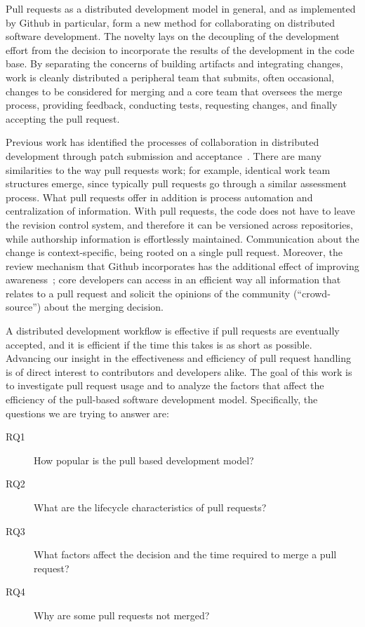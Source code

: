 \documentclass{sig-alternate}
\begin{document}
Pull requests as a distributed development model in general, and as implemented
by Github in particular, form a new method for collaborating on distributed
software development. The novelty lays on the decoupling of the development
effort from the decision to incorporate the results of the development in the
code base. By separating the concerns of building artifacts and integrating
changes, work is cleanly distributed a peripheral team that submits, often
occasional, changes to be considered for merging and a core team that oversees
the merge process, providing feedback, conducting tests, requesting changes, and
finally accepting the pull request.

Previous work has identified the processes of collaboration in distributed
development through patch submission and acceptance~\cite{MOCKU02, Bird07,
Weiss08}. There are many similarities to the way pull requests work; for
example, identical work team structures emerge, since typically pull requests go
through a similar assessment process. What pull requests offer in addition is
process automation and centralization of information. With pull requests, the
code does not have to leave the revision control system, and therefore it can be
versioned across repositories, while authorship information is effortlessly
maintained. Communication about the change is context-specific, being rooted on
a single pull request. Moreover, the review mechanism that Github incorporates
has the additional effect of improving awareness~\cite{Dabbi12}; core developers
can access in an efficient way all information that relates to a pull request
and solicit the opinions of the community (``crowd-source'') about the merging
decision.

A distributed development workflow is effective if pull requests are eventually
accepted, and it is efficient if the time this takes is as short as possible.
Advancing our insight in the effectiveness and efficiency of pull request
handling is of direct interest to contributors and developers alike. The goal
of this work is to investigate pull request usage and to analyze the factors
that affect the efficiency of the pull-based software development model.
Specifically, the questions we are trying to answer are: 

\begin{description}
  
  \item[RQ1] How popular is the pull based development model?

  \item[RQ2] What are the lifecycle characteristics of pull requests?
    
  \item[RQ3] What factors affect the decision and the time required to merge a pull request?

  \item[RQ4] Why are some pull requests not merged?

\end{description}
\end{document}
